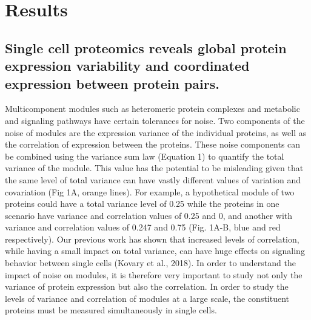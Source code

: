 \section{Results}
\subsection{Single cell proteomics reveals global protein expression variability and coordinated expression between protein pairs.}

Multicomponent modules such as heteromeric protein complexes and metabolic and signaling pathways have certain tolerances for noise. Two components of the noise of modules are the expression variance of the individual proteins, as well as the correlation of expression between the proteins. These noise components can be combined using the variance sum law (Equation 1) to quantify the total variance of the module. This value has the potential to be misleading given that the same level of total variance can have vastly different values of variation and covariation (Fig 1A, orange lines). For example, a hypothetical module of two proteins could have a total variance level of 0.25 while the proteins in one scenario have variance and correlation values of 0.25 and 0, and another with variance and correlation values of 0.247 and 0.75 (Fig. 1A-B, blue and red respectively). Our previous work has shown that increased levels of correlation, while having a small impact on total variance, can have huge effects on signaling behavior between single cells (Kovary et al., 2018). In order to understand the impact of noise on modules, it is therefore very important to study not only the variance of protein expression but also the correlation. In order to study the levels of variance and correlation of modules at a large scale, the constituent proteins must be measured simultaneously in single cells.

